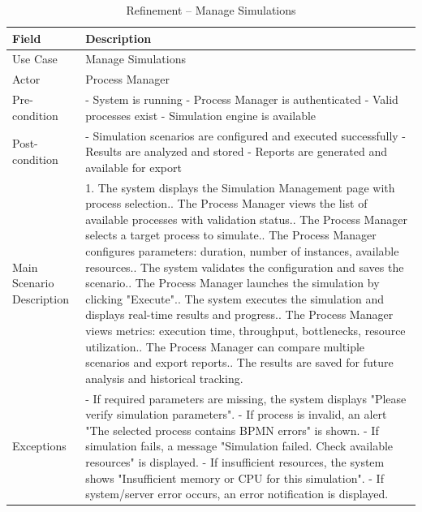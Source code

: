 \begin{table}[H]
\centering
\caption{Refinement -- Manage Simulations}
\label{tab:raffinement-simulations}
\begin{tabular}{|p{3cm}|p{12cm}|}
\hline
\textbf{Field} & \textbf{Description} \\
\hline
Use Case & Manage Simulations \\
\hline
Actor & Process Manager \\
\hline
Pre-condition & 
- System is running\newline
- Process Manager is authenticated\newline
- Valid processes exist\newline
- Simulation engine is available\newline \\
\hline
Post-condition & 
- Simulation scenarios are configured and executed successfully\newline
- Results are analyzed and stored\newline
- Reports are generated and available for export\newline \\
\hline
Main Scenario Description & 
1. The system displays the Simulation Management page with process selection.\newline
2. The Process Manager views the list of available processes with validation status.\newline
3. The Process Manager selects a target process to simulate.\newline
4. The Process Manager configures parameters: duration, number of instances, available resources.\newline
5. The system validates the configuration and saves the scenario.\newline
6. The Process Manager launches the simulation by clicking "Execute".\newline
7. The system executes the simulation and displays real-time results and progress.\newline
8. The Process Manager views metrics: execution time, throughput, bottlenecks, resource utilization.\newline
9. The Process Manager can compare multiple scenarios and export reports.\newline
10. The results are saved for future analysis and historical tracking. \\
\hline
Exceptions & 
- If required parameters are missing, the system displays "Please verify simulation parameters".\newline
- If process is invalid, an alert "The selected process contains BPMN errors" is shown.\newline
- If simulation fails, a message "Simulation failed. Check available resources" is displayed.\newline
- If insufficient resources, the system shows "Insufficient memory or CPU for this simulation".\newline
- If system/server error occurs, an error notification is displayed. \\
\hline
\end{tabular}
\end{table}

